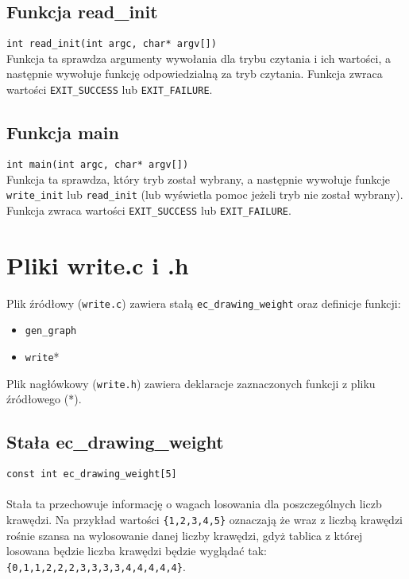 \documentclass[11pt,a4paper]{report}
\begin{document}
    \subsection{Funkcja read\_init}
    \verb|int read_init(int argc, char* argv[])|\\
    Funkcja ta sprawdza argumenty wywołania dla trybu czytania i ich wartości, a następnie wywołuje funkcję odpowiedzialną za tryb czytania. Funkcja zwraca wartości \verb|EXIT_SUCCESS| lub \verb|EXIT_FAILURE|.\\
    \subsection{Funkcja main}
    \verb|int main(int argc, char* argv[])|\\
    Funkcja ta sprawdza, który tryb został wybrany, a następnie wywołuje funkcje \verb|write_init| lub \verb|read_init| (lub wyświetla pomoc jeżeli tryb nie został wybrany). Funkcja zwraca wartości \verb|EXIT_SUCCESS| lub \verb|EXIT_FAILURE|.\\

    \newpage
    \section{Pliki write.c i .h}
    Plik źródłowy (\verb|write.c|) zawiera stałą \verb|ec_drawing_weight| oraz definicje funkcji:
    \begin{itemize}
        \item \verb|gen_graph|
        \item \verb|write|*
    \end{itemize}
    Plik nagłówkowy (\verb|write.h|) zawiera deklaracje zaznaczonych funkcji z pliku źródłowego (*).\\
    \subsection{Stała ec\_drawing\_weight}
    \verb|const int ec_drawing_weight[5]|\\
    \\
    Stała ta przechowuje informację o wagach losowania dla poszczególnych liczb krawędzi. Na przykład wartości \verb|{1,2,3,4,5}| oznaczają że wraz z liczbą krawędzi rośnie szansa na wylosowanie danej liczby krawędzi, gdyż tablica z której losowana będzie liczba krawędzi będzie wyglądać tak: \verb|{0,1,1,2,2,2,3,3,3,3,4,4,4,4,4}|.\\
\end{document}
